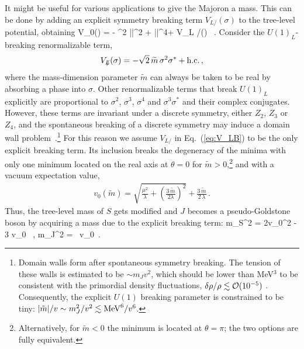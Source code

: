 \documentclass[a4paper,11pt]{article}
\begin{document}
It might be useful for various applications to give the Majoron a mass.  
This can be done by adding an explicit symmetry breaking term $ V_{L \!\!\!/}(\sigma)$ to the tree-level potential, 
obtaining
\be\label{treelevel}
V_0(\sigma) =  - \mu^2 |\sigma|^2 + \lambda |\sigma|^4+ V_{L \!\!\!/}(\sigma) \,  .
\ee
Consider the $U(1)_L$-breaking renormalizable term,
\begin{eqnarray} \label{eq:V_LB}
V_{L \!\!\!/}(\sigma) = - \sqrt{2} \, \widetilde{m} \, \sigma^2 \sigma^* + {\rm h.c.}\, ,
\end{eqnarray}
where the mass-dimension parameter $\widetilde{m}$ can always be taken to be real by absorbing a phase into $\sigma$. 
Other renormalizable terms that break $U(1)_L$ explicitly are proportional to $\sigma^2$, $\sigma^3$, $\sigma^4$ and $\sigma^3\sigma^*$ and their complex conjugates. However, these terms are invariant under a discrete symmetry, either $Z_2$, $Z_3$ or $Z_4$, and
the spontaneous breaking of a discrete symmetry may induce a domain wall problem~\cite{Vilenkin:1984ib,Kibble:1976sj}.\footnote{Domain walls form after spontaneous symmetry breaking. The tension of these walls is estimated to be $\sim m_J v^2$, which should be lower than MeV$^3$  to be consistent with the primordial density fluctuations,  $\delta \rho / \rho \lesssim {\cal O}(10^{-5})$ \cite{Zeldovich:1974uw}. Consequently, the explicit $U(1)$ breaking parameter is constrained to be tiny: $|\tilde{m}|/v \sim m_J^2 /v^2 \lesssim {\rm MeV}^6/v^6$.} 
For this reason we assume $V_{L \!\!\!/}$ in Eq.~(\ref{eq:V_LB}) 
to be the only explicit breaking term.  Its inclusion  breaks the degeneracy of the minima
with only one minimum located on the real axis at $\theta = 0$ for $\widetilde{m} > 0$,\footnote{Alternatively, for $\widetilde{m} < 0$ the minimum is located at $\theta = \pi$; the two options are fully equivalent.}
and with a vacuum expectation value,
\begin{eqnarray}
v_0(\widetilde{m})= \sqrt{\frac{\mu^2}{\lambda} + \left( \frac{3\,\widetilde{m}}{2\lambda} \right)^2} + \frac{3\,\widetilde{m}}{2\,\lambda}  \,  .
\end{eqnarray}
Thus, the tree-level mass of $S$ gets modified and $J$ becomes a pseudo-Goldstone boson by acquiring a mass due to the explicit breaking term:
\be
m_S^2 = 2\lambda v_0^2 - 3  v_0 \,  , \;\;\;
m_J^2 = \, v_0\, .
\ee
\end{document}
